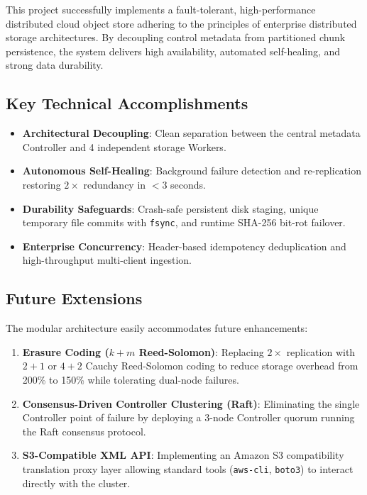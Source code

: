 \documentclass[11pt,a4paper]{article}
\begin{document}
This project successfully implements a fault-tolerant, high-performance distributed cloud object store adhering to the principles of enterprise distributed storage architectures. By decoupling control metadata from partitioned chunk persistence, the system delivers high availability, automated self-healing, and strong data durability.

\subsection{Key Technical Accomplishments}
\begin{itemize}[noitemsep]
    \item \textbf{Architectural Decoupling}: Clean separation between the central metadata Controller and 4 independent storage Workers.
    \item \textbf{Autonomous Self-Healing}: Background failure detection and re-replication restoring $2\times$ redundancy in $<3$ seconds.
    \item \textbf{Durability Safeguards}: Crash-safe persistent disk staging, unique temporary file commits with \texttt{fsync}, and runtime SHA-256 bit-rot failover.
    \item \textbf{Enterprise Concurrency}: Header-based idempotency deduplication and high-throughput multi-client ingestion.
\end{itemize}

\subsection{Future Extensions}
The modular architecture easily accommodates future enhancements:
\begin{enumerate}[noitemsep]
    \item \textbf{Erasure Coding ($k+m$ Reed-Solomon)}: Replacing $2\times$ replication with $2+1$ or $4+2$ Cauchy Reed-Solomon coding to reduce storage overhead from 200\% to 150\% while tolerating dual-node failures.
    \item \textbf{Consensus-Driven Controller Clustering (Raft)}: Eliminating the single Controller point of failure by deploying a 3-node Controller quorum running the Raft consensus protocol.
    \item \textbf{S3-Compatible XML API}: Implementing an Amazon S3 compatibility translation proxy layer allowing standard tools (\texttt{aws-cli}, \texttt{boto3}) to interact directly with the cluster.
\end{enumerate}
\end{document}

